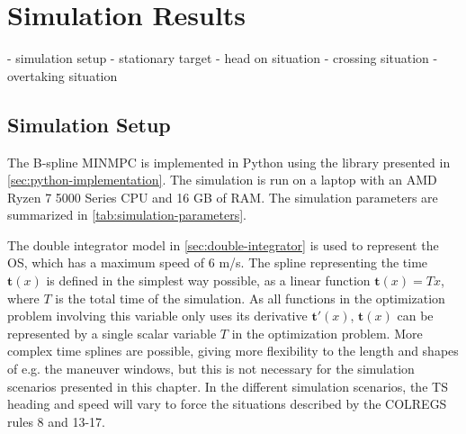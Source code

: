 
\chapter{Simulation Results}\label{chap:simulation-results}

- simulation setup
- stationary target
- head on situation
- crossing situation
- overtaking situation

\section{Simulation Setup}\label{sec:simulation-setup}

The B-spline MINMPC is implemented in Python using the library presented in \cref{sec:python-implementation}. The simulation is run on a laptop with an AMD Ryzen 7 5000 Series CPU and 16 GB of RAM. The simulation parameters are summarized in \cref{tab:simulation-parameters}. 

The double integrator model in \cref{sec:double-integrator} is used to represent the OS, which has a maximum speed of 6 m/s. The spline representing the time $\mathbf t(x)$ is defined in the simplest way possible, as a linear function $\mathbf t(x) = Tx$, where $T$ is the total time of the simulation. As all functions in the optimization problem involving this variable only uses its derivative $\mathbf t'(x)$, $\mathbf t(x)$ can be represented by a single scalar variable $T$ in the optimization problem. 
More complex time splines are possible, giving more flexibility to the length and shapes of e.g. the maneuver windows, but this is not necessary for the simulation scenarios presented in this chapter.
In the different simulation scenarios, the TS heading and speed will vary to force the situations described by the COLREGS rules 8 and 13-17.

